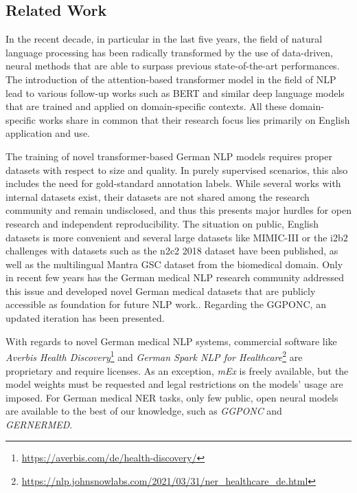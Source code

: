 \documentclass[runningheads]{llncs}
\begin{document}
\subsection{Related Work}
In the recent decade, in particular in the last five years, the field of natural language processing has been radically transformed by the use of data-driven, neural methods that are able to surpass previous state-of-the-art performances. The introduction of the attention-based transformer model\cite{vaswani_attention_2017} in the field of NLP lead to various follow-up works such as BERT\cite{devlin_bert_2018} and similar deep language models that are trained and applied on domain-specific contexts\cite{peng_transfer_2019,rasmy_med-bert_2021,lee_biobert_2019,alsentzer_publicly_2019,beltagy_scibert_2019,li_fine-tuning_2019}. All these domain-specific works share in common that their research focus lies primarily on English application and use.

The training of novel transformer-based German NLP models requires proper datasets with respect to size and quality. In purely supervised scenarios, this also includes the need for gold-standard annotation labels. While several works with internal datasets exist, their datasets are not shared among the research community and remain undisclosed\cite{wermter_annotated_2004,fette_information_2012,bretschneider_identifying_2013,toepfer_fine-grained_2015,lohr_operative_1992,kreuzthaler_detection_2015,roller_fine-grained_2016,cotik_negation_2016,krebs_semi-automatic_2017,hahn_3000pa-towards_2018,minarro-gimenez_quantitative_2019,konig_knowledge-based_2019,schafer_towards_2020}, and thus this presents major hurdles for open research and independent reproducibility. The situation on public, English datasets is more convenient and several large datasets like MIMIC-III\cite{pollard_mimic-iii_2016} or the i2b2 challenges with datasets such as the n2c2 2018 dataset\cite{henry_2018_2020} have been published, as well as the multilingual Mantra GSC\cite{kors_multilingual_2015} dataset from the biomedical domain. Only in recent few years has the German medical NLP research community addressed this issue and developed novel German medical datasets that are publicly accessible as foundation for future NLP work.\cite{borchert_ggponc_2020,kittner_annotation_2021}. Regarding the GGPONC\cite{borchert_ggponc_2020}, an updated iteration has been presented\cite{borchert_ggponc_2022}.

With regards to novel German medical NLP systems, commercial software like \textit{Averbis Health Discovery}\cite{noauthor_averbis_nodate}\footnote{\url{https://averbis.com/de/health-discovery/}} and \textit{German Spark NLP for Healthcare}\cite{noauthor_detect_nodate}\footnote{\url{https://nlp.johnsnowlabs.com/2021/03/31/ner_healthcare_de.html}} are proprietary and require licenses. As an exception, \textit{mEx}\cite{roller_mex_2018} is freely available, but the model weights must be requested and legal restrictions on the models' usage are imposed. For German medical NER tasks, only few public, open neural models are available to the best of our knowledge, such as \textit{GGPONC}\cite{borchert_ggponc_2022} and \textit{GERNERMED}\cite{frei_gernermed_2022}.
\end{document}

